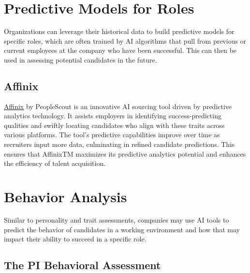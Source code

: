\documentclass[
]{book}
\begin{document}
\hypertarget{predictive-models-for-roles}{%
\section{Predictive Models for Roles}\label{predictive-models-for-roles}}

Organizations can leverage their historical data to build predictive models for specific roles, which are often trained by AI algorithms that pull from previous or current employees at the company who have been successful. This can then be used in assessing potential candidates in the future.

\hypertarget{affinix}{%
\subsection{Affinix}\label{affinix}}

\href{https://www.peoplescout.com/technology/}{Affinix} by PeopleScout is an innovative AI sourcing tool driven by predictive analytics technology. It assists employers in identifying success-predicting qualities and swiftly locating candidates who align with these traits across various platforms. The tool's predictive capabilities improve over time as recruiters input more data, culminating in refined candidate predictions. This ensures that AffinixTM maximizes its predictive analytics potential and enhances the efficiency of talent acquisition.

\hypertarget{behavior-analysis}{%
\section{Behavior Analysis}\label{behavior-analysis}}

Similar to personality and trait assessments, companies may use AI tools to predict the behavior of candidates in a working environment and how that may impact their ability to succeed in a specific role.

\hypertarget{the-pi-behavioral-assessment}{%
\subsection{The PI Behavioral Assessment}\label{the-pi-behavioral-assessment}}
\end{document}
